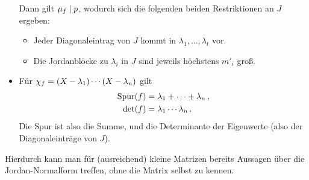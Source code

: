 \documentclass[a4paper,10pt,numbers = noenddot]{scrartcl}
\begin{document}
\begin{itemize}
    Dann gilt $\mu_{f} \mathrel{|} p$, wodurch sich die folgenden beiden Restriktionen an $J$ ergeben:
    \begin{itemize}
      \item
        Jeder Diagonaleintrag von $J$ kommt in $\lambda_1, \dotsc, \lambda_t$ vor.
      \item
        Die Jordanblöcke zu $\lambda_i$ in $J$ sind jeweils höchstens $m'_i$ groß.
    \end{itemize}
  \item
    Für $\chi_{f} = (X - \lambda_1) \dotsm (X - \lambda_n)$ gilt
    \begin{align*}
      \operatorname{Spur}(f)  &=  \lambda_1 + \dotsb + \lambda_n \,,  \\
      \det(f) &=  \lambda_1 \dotsm \lambda_n \,.
    \end{align*}
    Die Spur ist also die Summe, und die Determinante der Eigenwerte (also der Diagonaleinträge von $J$).
\end{itemize}

Hierdurch kann man für (ausreichend) kleine Matrizen bereits Aussagen über die Jordan-Nor\-mal\-form treffen, ohne die Matrix selbst zu kennen.
\end{document}
